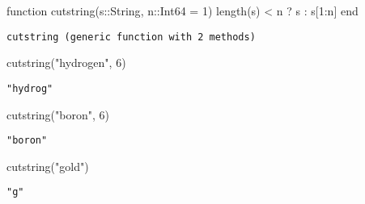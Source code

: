\documentclass[
  letterpaper,
  DIV=11,
  numbers=noendperiod]{scrreprt}
\newenvironment{Shaded}{\begin{snugshade}}{\end{snugshade}}
\newcommand{\DataTypeTok}[1]{\textcolor[rgb]{0.68,0.00,0.00}{#1}}
\newcommand{\FloatTok}[1]{\textcolor[rgb]{0.68,0.00,0.00}{#1}}
\newcommand{\FunctionTok}[1]{\textcolor[rgb]{0.28,0.35,0.67}{#1}}
\newcommand{\KeywordTok}[1]{\textcolor[rgb]{0.00,0.23,0.31}{#1}}
\newcommand{\NormalTok}[1]{\textcolor[rgb]{0.00,0.23,0.31}{#1}}
\newcommand{\OperatorTok}[1]{\textcolor[rgb]{0.37,0.37,0.37}{#1}}
\newcommand{\StringTok}[1]{\textcolor[rgb]{0.13,0.47,0.30}{#1}}
\begin{document}
\begin{Shaded}
\begin{Highlighting}[]
\KeywordTok{function} \FunctionTok{cutstring}\NormalTok{(s}\OperatorTok{::}\DataTypeTok{String}\NormalTok{, n}\OperatorTok{::}\DataTypeTok{Int64 }\OperatorTok{=} \FloatTok{1}\NormalTok{)}
    \FunctionTok{length}\NormalTok{(s) }\OperatorTok{\textless{}}\NormalTok{ n ? s }\OperatorTok{:}\NormalTok{ s[}\FloatTok{1}\OperatorTok{:}\NormalTok{n]   }
\KeywordTok{end}
\end{Highlighting}
\end{Shaded}

\begin{verbatim}
cutstring (generic function with 2 methods)
\end{verbatim}

\begin{Shaded}
\begin{Highlighting}[]
\FunctionTok{cutstring}\NormalTok{(}\StringTok{"hydrogen"}\NormalTok{, }\FloatTok{6}\NormalTok{)}
\end{Highlighting}
\end{Shaded}

\begin{verbatim}
"hydrog"
\end{verbatim}

\begin{Shaded}
\begin{Highlighting}[]
\FunctionTok{cutstring}\NormalTok{(}\StringTok{"boron"}\NormalTok{, }\FloatTok{6}\NormalTok{)}
\end{Highlighting}
\end{Shaded}

\begin{verbatim}
"boron"
\end{verbatim}

\begin{Shaded}
\begin{Highlighting}[]
\FunctionTok{cutstring}\NormalTok{(}\StringTok{"gold"}\NormalTok{)}
\end{Highlighting}
\end{Shaded}

\begin{verbatim}
"g"
\end{verbatim}
\end{document}
